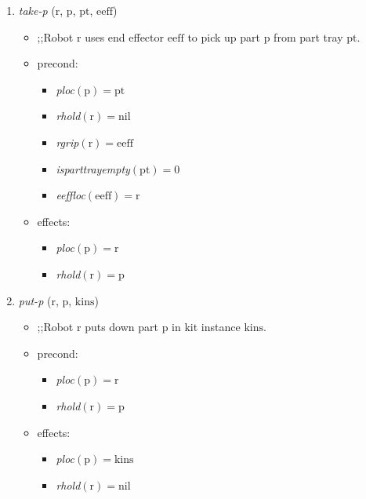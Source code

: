\begin{small}
\begin{enumerate}
\item \textsl{take-p} ($\mathrm{r}$, $\mathrm{p}$, $\mathrm{pt}$, $\mathrm{eeff}$)
\begin{itemize}
\item ;;Robot $\mathrm{r}$ uses end effector $\mathrm{eeff}$ to pick up part $\mathrm{p}$ from part tray $\mathrm{pt}$.
\item precond:
\begin{itemize}
\item[]\emph{ploc}$\mathrm{(p)=pt}$
\item[]\emph{rhold}$\mathrm{(r)=nil}$
\item[]\emph{rgrip}$\mathrm{(r)=eeff}$
\item[]\emph{isparttrayempty}$\mathrm{(pt)=0}$
\item[]\emph{eeffloc}$\mathrm{(eeff)=r}$

\end{itemize}
\item effects:
\begin{itemize}
\item[]\emph{ploc}$\mathrm{(p)=r}$
\item[]\emph{rhold}$\mathrm{(r)=p}$
\end{itemize}
\end{itemize}

\item \textsl{put-p} ($\mathrm{r}$, $\mathrm{p}$, $\mathrm{kins}$)
\begin{itemize}
\item ;;Robot $\mathrm{r}$ puts down part $\mathrm{p}$ in kit instance $\mathrm{kins}$.
\item precond:
\begin{itemize}
\item[]\emph{ploc}$\mathrm{(p)=r}$
\item[]\emph{rhold}$\mathrm{(r)=p}$
\end{itemize}
\item effects:
\begin{itemize}
\item[]\emph{ploc}$\mathrm{(p)=kins}$
\item[]\emph{rhold}$\mathrm{(r)=nil}$
\end{itemize}
\end{itemize}


\end{enumerate}
\end{small}

